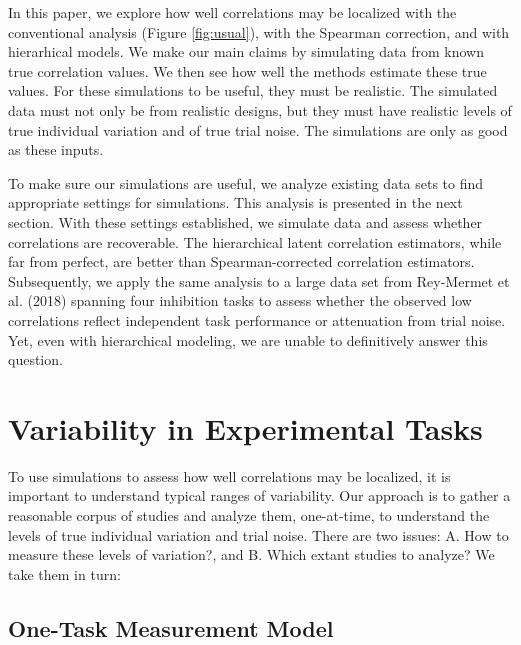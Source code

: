 \documentclass[
  ,man]{apa6}
\begin{document}
In this paper, we explore how well correlations may be localized with the conventional analysis (Figure \ref{fig:usual}), with the Spearman correction, and with hierarhical models. We make our main claims by simulating data from known true correlation values. We then see how well the methods estimate these true values. For these simulations to be useful, they must be realistic. The simulated data must not only be from realistic designs, but they must have realistic levels of true individual variation and of true trial noise. The simulations are only as good as these inputs.

To make sure our simulations are useful, we analyze existing data sets to find appropriate settings for simulations. This analysis is presented in the next section. With these settings established, we simulate data and assess whether correlations are recoverable. The hierarchical latent correlation estimators, while far from perfect, are better than Spearman-corrected correlation estimators. Subsequently, we apply the same analysis to a large data set from Rey-Mermet et al. (2018) spanning four inhibition tasks to assess whether the observed low correlations reflect independent task performance or attenuation from trial noise. Yet, even with hierarchical modeling, we are unable to definitively answer this question.

\hypertarget{variability-in-experimental-tasks}{%
\section{Variability in Experimental Tasks}\label{variability-in-experimental-tasks}}

To use simulations to assess how well correlations may be localized, it is important to understand typical ranges of variability. Our approach is to gather a reasonable corpus of studies and analyze them, one-at-time, to understand the levels of true individual variation and trial noise. There are two issues: A. How to measure these levels of variation?, and B. Which extant studies to analyze? We take them in turn:

\hypertarget{one-task-measurement-model}{%
\subsection{One-Task Measurement Model}\label{one-task-measurement-model}}
\end{document}
